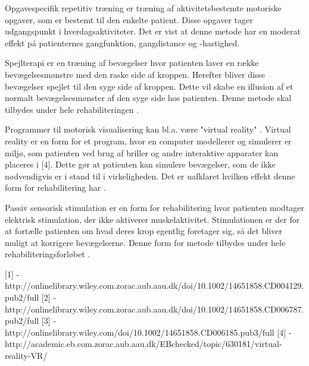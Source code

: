 Opgavespecifik repetitiv træning er træning af aktivitetsbestemte motoriske opgaver, som er bestemt til den enkelte patient. Disse opgaver tager udgangspunkt i hverdagsaktiviteter. Det er vist at denne metode har en moderat effekt på patienternes gangfunktion, gangdistance og -hastighed. \cite{Sundhedsstyrelsen2010}

Spejlterapi er en træning af bevægelser hvor patienten laver en række bevægelsesmønstre med den raske side af kroppen. Herefter bliver disse bevægelser spejlet til den syge side af kroppen. Dette vil skabe en illusion af et normalt bevægelsesmønster af den syge side hos patienten. \cite{Sundhedsstyrelsen2010} Denne metode skal tilbydes under hele rehabiliteringen \cite{Sundhedsstyrelsen2011a}.

Programmer til motorisk visualisering kan bl.a. være "virtual reality" \cite{Sundhedsstyrelsen2010}. Virtual reality er en form for et program, hvor en computer modellerer og simulerer er miljø, som patienten ved brug af briller og andre interaktive apparater kan placeres i [4]. Dette gør at patienten kan simulere bevægelser, som de ikke nødvendigvis er i stand til i virkeligheden. Det er uafklaret hvilken effekt denne form for rehabilitering har \cite{Sundhedsstyrelsen2010}.

Passiv sensorisk stimulation er en form for rehabilitering hvor patienten modtager elektrisk stimulation, der ikke aktiverer muskelaktivitet. Stimulationen er der for at fortælle patienten om hvad deres krop egentlig foretager sig, så det bliver muligt at korrigere bevægelserne. \cite{Sundhedsstyrelsen2010} Denne form for metode tilbydes under hele rehabiliteringsforløbet \cite{Sundhedsstyrelsen2011a}.



[1] - http://onlinelibrary.wiley.com.zorac.aub.aau.dk/doi/10.1002/14651858.CD004129.pub2/full
[2] - http://onlinelibrary.wiley.com.zorac.aub.aau.dk/doi/10.1002/14651858.CD006787.pub2/full
[3] - http://onlinelibrary.wiley.com/doi/10.1002/14651858.CD006185.pub3/full
[4] - http://academic.eb.com.zorac.aub.aau.dk/EBchecked/topic/630181/virtual-reality-VR/

